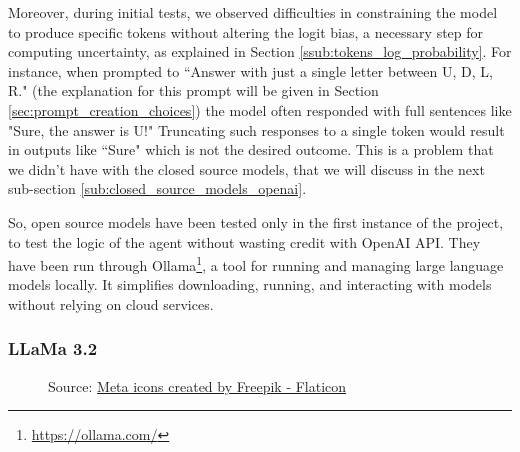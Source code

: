 Moreover, during initial tests, we observed difficulties in constraining the model
to produce specific tokens without altering the logit bias, a necessary step for
computing uncertainty, as explained in Section \ref{ssub:tokens_log_probability}.
For instance, when prompted to ``Answer with just a single letter between U, D, L,
R." (the explanation for this prompt will be given in Section \ref{sec:prompt_creation_choices})
the model often responded with full sentences like "Sure, the answer is U!"
Truncating such responses to a single token would result in outputs like ``Sure"
which is not the desired outcome. This is a problem that we didn't have with the
closed source models, that we will discuss in the next sub-section \ref{sub:closed_source_models_openai}.

So, open source models have been tested only in the first instance of the
project, to test the logic of the agent without wasting credit with OpenAI API.
They have been run through Ollama\footnote{\url{https://ollama.com/}}, a tool
for running and managing large language models locally. It simplifies downloading,
running, and interacting with models without relying on cloud services.

\subsubsection{LLaMa 3.2}
\begin{figure}
  \centering
  \def\stackalignment{l}
  {\scriptsize \parbox[t]{\linewidth}{Source: \href{https://www.flaticon.com/free-icon/meta_6033716}{Meta icons created by Freepik - Flaticon}}}
\end{figure}

